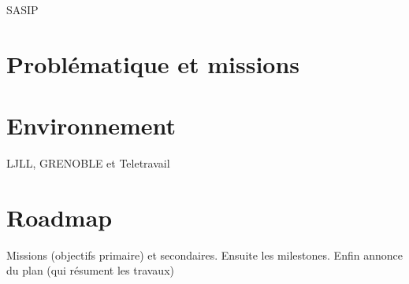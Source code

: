 SASIP 








\section{Problématique et missions}













\section{Environnement}

LJLL, GRENOBLE et Teletravail










\section{Roadmap}
Missions (objectifs primaire) et secondaires. Ensuite les milestones. Enfin annonce du plan (qui résument les travaux)

















